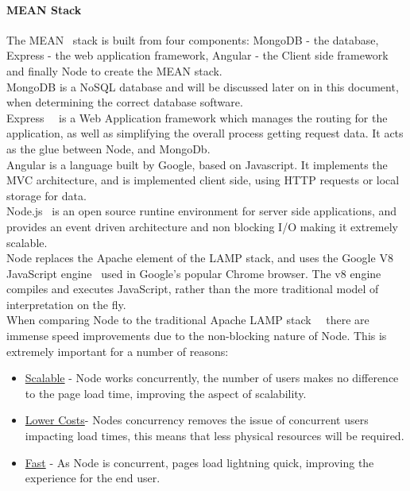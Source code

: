 \documentclass[draft,preprint,12pt,3p]{elsarticle}
\begin{document}
\paragraph{MEAN Stack}
The MEAN~\cite{mean} stack is built from four components: MongoDB - the database, Express - the web application framework, Angular - the Client side framework and finally Node to create the MEAN stack.\\
MongoDB is a NoSQL database and will be discussed later on in this document, when determining the correct database software.\\
Express~\cite{express}~\cite{whatisexpress} is a Web Application framework which manages the routing for the application, as well as simplifying the overall process getting request data. It acts as the glue between Node, and MongoDb.\\
Angular is a language built by Google, based on Javascript. It implements the MVC architecture, and is implemented client side, using HTTP requests or local storage for data.\\
Node.js~\cite{nodejs} is an open source runtine environment for server side applications, and provides an event driven architecture and non blocking I/O making it extremely scalable.\\
Node replaces the Apache element of the LAMP stack, and uses the Google V8 JavaScript engine~\cite{v8engine} used in Google's popular Chrome browser. The v8 engine compiles and executes JavaScript, rather than the more traditional model of interpretation on the fly.\\
When comparing Node to the traditional Apache LAMP stack~\cite{phpvsnodejs}~\cite{nodejsvsapache} there are immense speed improvements due to the non-blocking nature of Node. This is extremely important for a number of reasons:
\begin{itemize}
  \item \underline{Scalable} - Node works concurrently, the number of users makes no difference to the page load time, improving the aspect of scalability.
  \item \underline{Lower Costs}- Nodes concurrency removes the issue of concurrent users impacting load times, this means that less physical resources will be required.
  \item \underline{Fast} - As Node is concurrent, pages load lightning quick, improving the experience for the end user.
\end{itemize}
\end{document}
